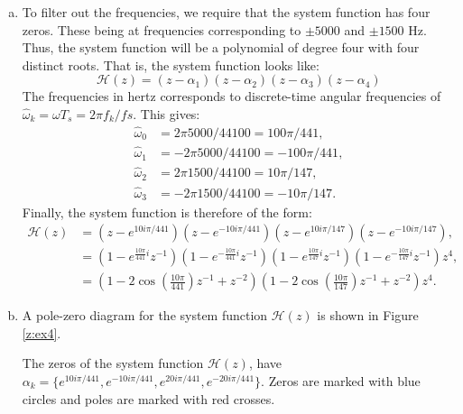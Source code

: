 \begin{enumerate}
\begin{enumerate}[a)]
\item To filter out the frequencies, we require that the system function has four zeros. These being at frequencies corresponding to $\pm5000$ and $\pm1500$ Hz. 
Thus, the system function will be a polynomial of degree four with four distinct roots. That is, the system function looks like:
$$\mathcal{H}(z)=(z-\alpha_1)(z-\alpha_2)(z-\alpha_3)(z-\alpha_4)$$
The frequencies in hertz corresponds to discrete-time angular frequencies of $\hat{\omega}_k=\omega T_s=2\pi f_k/fs$. This gives:
\begin{align*}
    \hat{\omega}_{0} &=  2\pi5000/44100 =  100\pi/441,\\
    \hat{\omega}_{1} &= -2\pi5000/44100 = -100\pi/441,\\
    \hat{\omega}_{2} &=  2\pi1500/44100 =  10\pi/147,\\
    \hat{\omega}_{3} &= -2\pi1500/44100 = -10\pi/147.
\end{align*}
Finally, the system function is therefore of the form:
\begin{align*}
    \mathcal{H}(z)&=(z-e^{10i\pi/441})(z-e^{-10i\pi/441})(z-e^{10i\pi/147})(z-e^{-10i\pi/147}), \\
    &=(1-e^{\frac{10\pi}{441}i}z^{-1})(1-e^{-\frac{10\pi}{441}i}z^{-1})(1-e^{\frac{10\pi}{147}i}z^{-1})(1-e^{-\frac{10\pi}{147}i}z^{-1})z^{4},\\
    &=(1-2\cos\left(\frac{10\pi}{441}\right)z^{-1}+z^{-2})(1-2\cos\left(\frac{10\pi}{147}\right)z^{-1}+z^{-2})z^{4}.
\end{align*}

\item A pole-zero diagram for the system function $\mathcal{H}(z)$ is shown in Figure \ref{z:ex4}.

\begin{marginfigure}
\begin{center}
\end{center}
\caption{The zeros of the system function $\mathcal{H}(z)$,
have $\alpha_k=\{e^{10i\pi/441},e^{-10i\pi/441},e^{20i\pi/441},e^{-20i\pi/441}\}$. Zeros are marked with blue circles and poles are marked with red crosses.}
\label{z:ex4}
\end{marginfigure}


\end{enumerate}
\end{enumerate}
